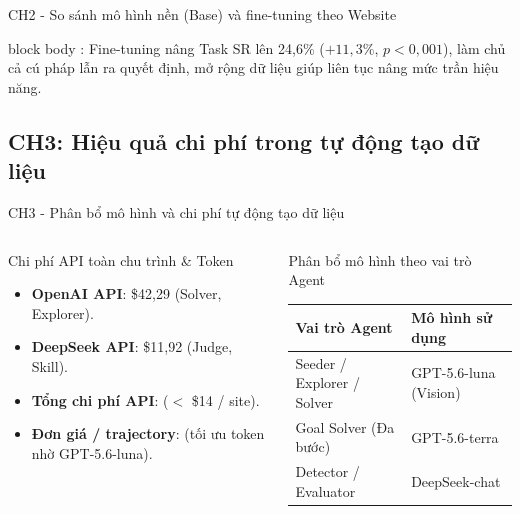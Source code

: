 \begin{frame}{CH2 - So sánh mô hình nền (Base) và fine-tuning theo Website}
  \vspace{0.02cm}
  \begin{beamercolorbox}[wd=\textwidth,sep=2pt,leftskip=6pt,rightskip=6pt,rounded=true]{block body}
    \scriptsize {}: Fine-tuning nâng Task SR lên 24,6\% ($+11,3\%$, $p < 0{,}001$), làm chủ cả cú pháp lẫn ra quyết định, mở rộng dữ liệu giúp liên tục nâng mức trần hiệu năng.
  \end{beamercolorbox}
\end{frame}

\subsection{CH3: Hiệu quả chi phí trong tự động tạo dữ liệu}
\begin{frame}{CH3 - Phân bổ mô hình và chi phí tự động tạo dữ liệu}
  \vspace{-0.25cm}
  \begin{columns}[t,onlytextwidth]
    \begin{column}{0.48\textwidth}
      \begin{block}{Chi phí API toàn chu trình \& Token}
        \begin{itemize}\scriptsize\setlength{\itemsep}{1pt}
          \item \textbf{OpenAI API}: \$42,29 (Solver, Explorer).
          \item \textbf{DeepSeek API}: \$11,92 (Judge, Skill).
          \item \textbf{Tổng chi phí API}:  ($<$ \$14 / site).
          \item \textbf{Đơn giá / trajectory}:  (tối ưu token  nhờ GPT-5.6-luna).
        \end{itemize}
      \end{block}
    \end{column}
    \hfill
    \begin{column}{0.50\textwidth}
      \begin{block}{Phân bổ mô hình theo vai trò Agent}
        \centering
        \vspace{-0.05cm}
        \setlength{\tabcolsep}{1.5pt}
        \scriptsize
        \begin{tabular}{@{}L{2.8cm} L{2.8cm}@{}}
          \toprule
          \textbf{Vai trò Agent} & \textbf{Mô hình sử dụng} \\
          \midrule
          Seeder / Explorer / Solver & GPT-5.6-luna (Vision) \\
          Goal Solver (Đa bước) & GPT-5.6-terra \\
          Detector / Evaluator & DeepSeek-chat \\
          \bottomrule
        \end{tabular}
        \vspace{0.01cm}
      \end{block}
    \end{column}
  \end{columns}


\end{frame}
